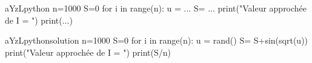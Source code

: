 

\begin{SaveVerbatim}{aYzLpython}
n=1000
S=0
for i in range(n):
  u = ...
  S= ...
print("Valeur approchée de I = ")
print(...)
\end{SaveVerbatim}

\begin{SaveVerbatim}{aYzLpythonsolution}
	n=1000
	S=0
	for i in range(n):
	u = rand()
	S= S+sin(sqrt(u))
	print("Valeur approchée de I = ")
	print(S/n)
\end{SaveVerbatim}


